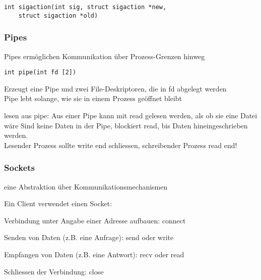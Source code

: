 \begin{multicols*}{5}
	\vspace{-3pt}
	\begin{lstlisting}
int sigaction(int sig, struct sigaction *new,
	struct sigaction *old)		
	\end{lstlisting}

	\vspace{-5pt}

\subsubsection{Pipes}
	Pipes ermöglichen Kommunikation über Prozess-Grenzen hinweg

	\vspace{-5pt}

	\begin{lstlisting}
int pipe(int fd [2])		
	\end{lstlisting}

	\vspace{-5pt}

	Erzeugt eine Pipe und zwei File-Deskriptoren, die in fd abgelegt werden\\
	Pipe lebt solange, wie sie in einem Prozess geöffnet bleibt

	\vspace{-3pt}
	\drule{\linewidth}{1pt}

\textcolor{h}{lesen aus pipe:}
Aus einer Pipe kann mit read gelesen werden, als ob sie eine Datei wäre Sind keine Daten in der Pipe, blockiert read, bis Daten hineingeschrieben werden.\\
Lesender Prozess sollte write end schliessen, schreibender Prozess read end!



\subsubsection{Sockets}
eine Abstraktion über Kommunikationsmechanismen 

Ein \textcolor{h}{Client verwendet einen Socket}:
\begin{compactenum}[1.]
	\item Verbindung unter Angabe einer Adresse aufbauen: connect
	\item Senden von Daten (z.B. eine Anfrage): send oder write
	\item Empfangen von Daten (z.B. eine Antwort): recv oder read
	\item Schliessen der Verbindung: close
\end{compactenum}


\end{multicols*}
